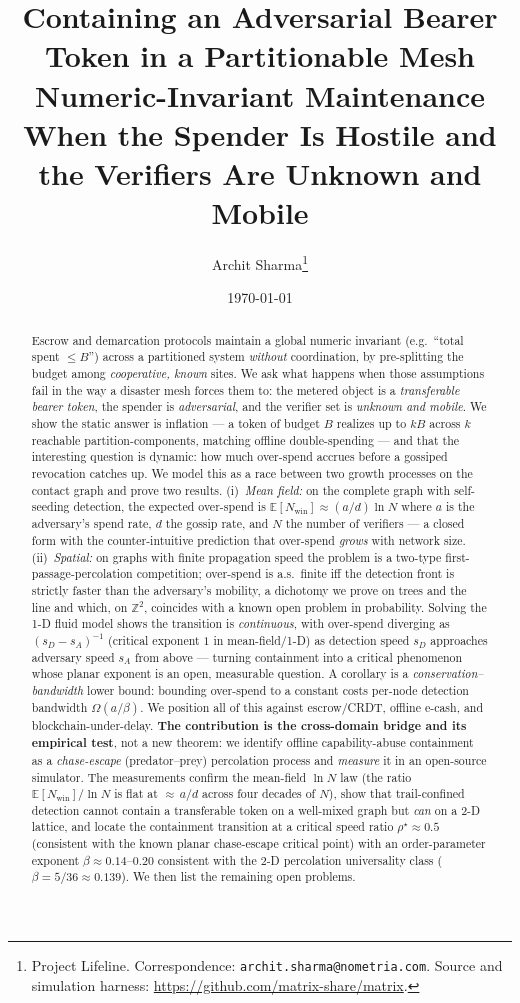 \documentclass[11pt]{article}
\title{\textbf{Containing an Adversarial Bearer Token in a Partitionable Mesh}\\[2pt]
\large Numeric-Invariant Maintenance When the Spender Is Hostile and the
Verifiers Are Unknown and Mobile}
\author{Archit Sharma\thanks{Project Lifeline. Correspondence: \texttt{archit.sharma@nometria.com}.
Source and simulation harness: \url{https://github.com/matrix-share/matrix}.}}
\date{\today}
\theoremstyle{plain}
\theoremstyle{definition}
\newcommand{\Nwin}{N_{\mathrm{win}}}
\newcommand{\E}{\mathbb{E}}
\begin{document}
\maketitle

\begin{abstract}
Escrow and demarcation protocols maintain a global numeric invariant (e.g.\ ``total
spent $\le B$'') across a partitioned system \emph{without} coordination, by
pre-splitting the budget among \emph{cooperative, known} sites. We ask what
happens when those assumptions fail in the way a disaster mesh forces them to:
the metered object is a \emph{transferable bearer token}, the spender is
\emph{adversarial}, and the verifier set is \emph{unknown and mobile}. We show the
static answer is inflation --- a token of budget $B$ realizes up to $kB$ across
$k$ reachable partition-components, matching offline double-spending --- and that
the interesting question is dynamic: how much over-spend accrues before a gossiped
revocation catches up. We model this as a race between two growth processes on the
contact graph and prove two results. (i)~\emph{Mean field:} on the complete graph
with self-seeding detection, the expected over-spend is $\E[\Nwin]\approx (a/d)\ln
N$ where $a$ is the adversary's spend rate, $d$ the gossip rate, and $N$ the number
of verifiers --- a closed form with the counter-intuitive prediction that
over-spend \emph{grows} with network size. (ii)~\emph{Spatial:} on graphs with
finite propagation speed the problem is a two-type first-passage-percolation
competition; over-spend is a.s.\ finite iff the detection front is strictly faster
than the adversary's mobility, a dichotomy we prove on trees and the line and
which, on $\mathbb{Z}^2$, coincides with a known open problem in probability.
Solving the 1-D fluid model shows the transition is \emph{continuous}, with
over-spend diverging as $(s_D-s_A)^{-1}$ (critical exponent $1$ in mean-field/1-D)
as detection speed $s_D$ approaches adversary speed $s_A$ from above --- turning
containment into a critical phenomenon whose planar exponent is an open,
measurable question. A
corollary is a \emph{conservation--bandwidth} lower bound: bounding over-spend to a
constant costs per-node detection bandwidth $\Omega(a/\beta)$. We position all of
this against escrow/CRDT, offline e-cash, and blockchain-under-delay.
\textbf{The contribution is the cross-domain bridge and its empirical test}, not a
new theorem: we identify offline capability-abuse containment as a
\emph{chase-escape} (predator--prey) percolation process and \emph{measure} it in
an open-source simulator. The measurements confirm the mean-field $\ln N$ law (the
ratio $\E[\Nwin]/\ln N$ is flat at ${\approx}\,a/d$ across four decades of $N$),
show that trail-confined detection cannot contain a transferable token on a
well-mixed graph but \emph{can} on a $2$-D lattice, and locate the containment
transition at a critical speed ratio $\rho^\star\!\approx\!0.5$ (consistent with
the known planar chase-escape critical point) with an order-parameter exponent
$\beta\approx0.14$--$0.20$ consistent with the $2$-D percolation universality
class ($\beta=5/36\approx0.139$). We then list the remaining open problems.
\end{abstract}
\end{document}
